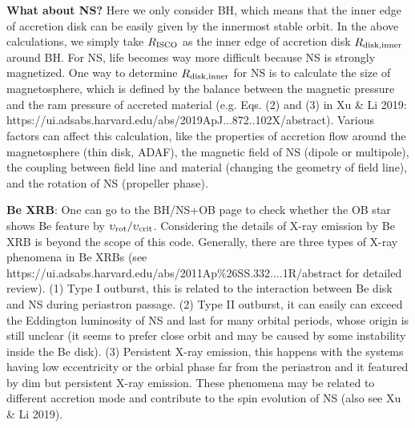 \documentclass{article}
\begin{document}
{\Large \textbf{What about NS?}}  
\normalsize
Here we only consider BH, which means that the inner edge of accretion disk can be easily given by the innermost stable orbit. In the above calculations, we simply take $R_{\rm ISCO}$ as the inner edge of accretion disk $R_{\rm disk,inner}$ around BH. For NS, life becomes way more difficult because NS is strongly magnetized.  One way to determine $R_{\rm disk,inner}$ for NS is to calculate the size of magnetosphere, which is defined by the balance between the magnetic pressure and the ram pressure of accreted material (e.g. Eqs. (2) and (3) in Xu \& Li 2019: https://ui.adsabs.harvard.edu/abs/2019ApJ...872..102X/abstract). Various factors can affect this calculation, like the properties of accretion flow around the magnetosphere (thin disk, ADAF), the magnetic field of NS (dipole or multipole), the coupling between field line and material (changing the geometry of field line), and the rotation of NS (propeller phase). 

{\Large \textbf{Be XRB}:}
\normalsize
One can go to the BH/NS+OB page to check whether the OB star shows Be feature by $\upsilon_{\rm rot}/\upsilon_{\rm crit}$. Considering the details of X-ray emission by Be XRB is beyond the scope of this code. Generally, there are three types of X-ray phenomena in Be XRBs \newline(see https://ui.adsabs.harvard.edu/abs/2011Ap\%26SS.332....1R/abstract for detailed review). (1) Type I outburst, this is related to the interaction between Be disk and NS during periastron passage. (2) Type II outburst, it can easily can exceed the Eddington luminosity of NS and last for many orbital periods, whose origin is still unclear (it seems to prefer close orbit and may be caused by some instability inside the Be disk). (3) Persistent X-ray emission, this happens with the systems having low eccentricity or the orbial phase far from the periastron and it featured by dim but persistent X-ray emission. These phenomena may be related to different accretion mode and contribute to the spin evolution of NS (also see Xu \& Li 2019). 
\end{document}
